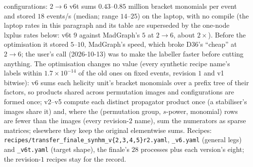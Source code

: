 \documentclass[11pt]{article}
\newcommand{\code}[1]{\texttt{#1}}
\begin{document}
configurations: $2\to6$ v6t sums $0.43$--$0.85$ million bracket monomials per event and stored $18$ events/s (median; range $14$--$25$) on the laptop, with no compile (the laptop rates in this
paragraph and its table are superseded by the one-node lxplus rates below: v6t $9$ against MadGraph's $5$ at $2\to6$,
about $2\times$). Before the optimisation it stored $5$--$10$, MadGraph's
speed, which broke D36's ``cheap'' at $2\to6$; the user's call (2026-10-13) was to make the labeller faster before
cutting anything. The optimisation changes no value (every synthetic recipe name's labels within $1.7\times10^{-14}$
of the old ones on fixed events, revision $1$ and v1 bitwise): v6 sums each helicity unit's bracket monomials over a
prefix tree of their factors, so products shared across permutation images and configurations are formed once;
v2--v5 compute each distinct propagator product once (a stabiliser's images share it) and, where the
(permutation group, $s$-power, monomial) rows are fewer than the images (every revision-$2$ name), sum the numerators
as sparse matrices; elsewhere they keep the original elementwise sums. Recipes: \code{recipes/transfer\_finale\_synhm\_v\{2,3,4,5\}r2.yaml},
\code{\_v6.yaml} (general legs) and \code{\_v6t.yaml} (target shape), the finale's $28$ processes plus each version's
eight; the revision-$1$ recipes stay for the record.
\end{document}
